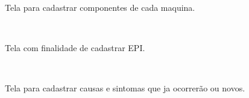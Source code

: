 Tela para cadastrar componentes de cada maquina.

\begin{figure}[htb]
	\centering
	\mbox{%
		\qquad
	}
	
\end{figure}

\newpage

Tela com finalidade de cadastrar EPI.

\begin{figure}[htb]
	\centering
	\mbox{%
		\qquad
	}
	
\end{figure}
\newpage
Tela para cadastrar causas e sintomas que ja ocorrerão ou novos.

